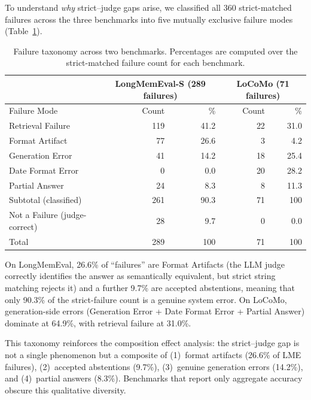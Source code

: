 \documentclass[10pt]{article}
\begin{document}
To understand \emph{why} strict--judge gaps arise, we classified all 360 strict-matched failures across the three benchmarks into five mutually exclusive failure modes (Table~\ref{tab:failure-taxonomy}).

\begin{table}[h]
\centering
\caption{Failure taxonomy across two benchmarks. Percentages are computed over the strict-matched failure count for each benchmark.}
\label{tab:failure-taxonomy}
\begin{tabular}{lrrrr}
\toprule
 & \multicolumn{2}{c}{LongMemEval-S (289 failures)} & \multicolumn{2}{c}{LoCoMo (71 failures)} \\
\midrule
Failure Mode & Count & \% & Count & \% \\
\midrule
Retrieval Failure & 119 & 41.2 & 22 & 31.0 \\
Format Artifact & 77 & 26.6 & 3 & 4.2 \\
Generation Error & 41 & 14.2 & 18 & 25.4 \\
Date Format Error & 0 & 0.0 & 20 & 28.2 \\
Partial Answer & 24 & 8.3 & 8 & 11.3 \\
\midrule
Subtotal (classified) & 261 & 90.3 & 71 & 100 \\
Not a Failure (judge-correct) & 28 & 9.7 & 0 & 0.0 \\
\midrule
Total & 289 & 100 & 71 & 100 \\
\bottomrule
\end{tabular}
\end{table}

On LongMemEval, 26.6\% of ``failures'' are Format Artifacts (the LLM judge correctly identifies the answer as semantically equivalent, but strict string matching rejects it) and a further 9.7\% are accepted abstentions, meaning that only 90.3\% of the strict-failure count is a genuine system error. On LoCoMo, generation-side errors (Generation Error + Date Format Error + Partial Answer) dominate at 64.9\%, with retrieval failure at 31.0\%.

This taxonomy reinforces the composition effect analysis: the strict--judge gap is not a single phenomenon but a composite of (1)~format artifacts (26.6\% of LME failures), (2)~accepted abstentions (9.7\%), (3)~genuine generation errors (14.2\%), and (4)~partial answers (8.3\%). Benchmarks that report only aggregate accuracy obscure this qualitative diversity.
\end{document}
